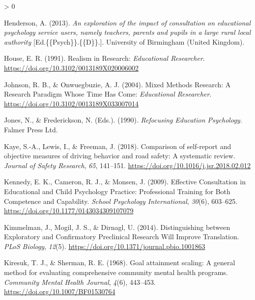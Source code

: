 \documentclass[
  english,
  man]{apa}
\newlength{\cslhangindent}
\newenvironment{CSLReferences}[2] %
 {%
  \setlength{\parindent}{0pt}
  \ifodd #1 \everypar{\setlength{\hangindent}{\cslhangindent}}\ignorespaces\fi
  \ifnum #2 > 0
  \setlength{\parskip}{#2\baselineskip}
  \fi
 }%
 {}
\begin{document}
\begin{CSLReferences}{1}{0}
\leavevmode\hypertarget{ref-hendersonExplorationImpactConsultation2013}{}%
Henderson, A. (2013). \emph{An exploration of the impact of consultation on educational psychology service users, namely teachers, parents and pupils in a large rural local authority} {[}Ed.\{\{Psych\}\}.\{\{D\}\}.{]}. University of Birmingham (United Kingdom).

\leavevmode\hypertarget{ref-houseRealismResearch1991}{}%
House, E. R. (1991). Realism in {Research}: \emph{Educational Researcher}. \url{https://doi.org/10.3102/0013189X020006002}

\leavevmode\hypertarget{ref-johnsonMixedMethodsResearch2004a}{}%
Johnson, R. B., \& Onwuegbuzie, A. J. (2004). Mixed {Methods Research}: {A Research Paradigm Whose Time Has Come}: \emph{Educational Researcher}. \url{https://doi.org/10.3102/0013189X033007014}

\leavevmode\hypertarget{ref-jonesRefocusingEducationPsychology1990}{}%
Jones, N., \& Frederickson, N. (Eds.). (1990). \emph{Refocusing {Education Psychology}}. {Falmer Press Ltd}.

\leavevmode\hypertarget{ref-kayeComparisonSelfreportObjective2018}{}%
Kaye, S.-A., Lewis, I., \& Freeman, J. (2018). Comparison of self-report and objective measures of driving behavior and road safety: {A} systematic review. \emph{Journal of Safety Research}, \emph{65}, 141--151. \url{https://doi.org/10.1016/j.jsr.2018.02.012}

\leavevmode\hypertarget{ref-kennedyEffectiveConsultationEducational2009a}{}%
Kennedy, E. K., Cameron, R. J., \& Monsen, J. (2009). Effective {Consultation} in {Educational} and {Child Psychology Practice}: {Professional Training} for {Both Competence} and {Capability}. \emph{School Psychology International}, \emph{30}(6), 603--625. \url{https://doi.org/10.1177/0143034309107079}

\leavevmode\hypertarget{ref-kimmelmanDistinguishingExploratoryConfirmatory2014}{}%
Kimmelman, J., Mogil, J. S., \& Dirnagl, U. (2014). Distinguishing between {Exploratory} and {Confirmatory Preclinical Research Will Improve Translation}. \emph{PLoS Biology}, \emph{12}(5). \url{https://doi.org/10.1371/journal.pbio.1001863}

\leavevmode\hypertarget{ref-kiresukGoalAttainmentScaling1968}{}%
Kiresuk, T. J., \& Sherman, R. E. (1968). Goal attainment scaling: {A} general method for evaluating comprehensive community mental health programs. \emph{Community Mental Health Journal}, \emph{4}(6), 443--453. \url{https://doi.org/10.1007/BF01530764}


\end{CSLReferences}
\end{document}

